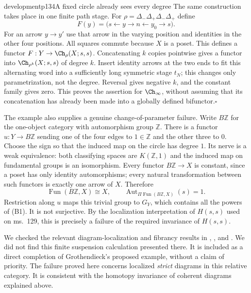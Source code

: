 \begin{dcomment}{development}{p134}{A fixed circle already sees every degree}
The same construction takes place in one finite path stage. For
$\rho=\Delta_-\Delta_+\Delta_-\Delta_+$ define
\[
 F(y)=\bigl(s\longleftarrow y\longrightarrow n
                    \longleftarrow y_0\longrightarrow s\bigr).
\]
For an arrow $y\to y'$ use that arrow in the varying position and identities in the other four positions. All squares commute because $X$ is a poset. This defines a functor $F:Y\to\Ch_\rho(X;s,s)$. Concatenating $k$ copies pointwise gives a functor into $\Ch_{\rho^k}(X;s,s)$ of degree $k$. Insert identity arrows at the two ends to fit this alternating word into a sufficiently long symmetric stage $t_N$; this changes only parametrization, not the degree. Reversal gives negative $k$, and the constant family gives zero. This proves the assertion for $\Ch_\infty$, without assuming that its concatenation has already been made into a globally defined bifunctor.\hfill$\square$

The example also supplies a genuine change-of-parameter failure. Write $B\mathbb Z$ for the one-object category with automorphism group $\mathbb Z$. There is a functor $u:Y\to B\mathbb Z$ sending one of the four edges to $1\in\mathbb Z$ and the other three to $0$. Choose the sign so that the induced map on the circle has degree $1$. Its nerve is a weak equivalence: both classifying spaces are $K(\mathbb Z,1)$ and the induced map on fundamental groups is an isomorphism. Every functor $B\mathbb Z\to X$ is constant, since a poset has only identity automorphisms; every natural transformation between such functors is exactly one arrow of $X$. Therefore
\[
 \operatorname{Fun}(B\mathbb Z,X)\cong X,
 \qquad
 \operatorname{Aut}_{\Pi\operatorname{Fun}(B\mathbb Z,X)}(s)=1.
\]
Restriction along $u$ maps this trivial group to $G_Y$, which contains all the powers of (B1). It is not surjective. By the localization interpretation of $H(s,s)$ used on ms.~129, this is precisely a failure of the required invariance of $H(s,s)$.

We checked the relevant diagram-localization and fibrancy results in \citet{Cisinski2009LocallyConstant}, \citet{Thomason1980}, and \citet{Raptis2010}. We did not find this finite suspension calculation presented there. It is included as a direct completion of Grothendieck's proposed example, without a claim of priority. The failure proved here concerns localized \emph{strict} diagrams in this relative category. It is consistent with the homotopy invariance of coherent diagrams explained above.
\end{dcomment}

